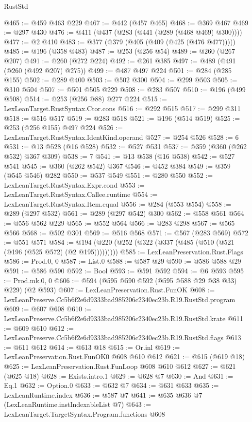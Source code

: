 \begin{lexlean}{RustStd}
\begin{coremodule}
@465 := @459 @463 @229
@467 := @442 (@457 @465)
@468 := @369 @467
@469 := @297 @430
@476 := @411 (@437 (@283 (@441 (@289 (@468 @469) @300))))
@477 := @2 @410
@483 := @377 (@379 (@405 (@409 (@425 (@476 @477)))))
@485 := @196 (@358 @483)
@487 := @253 (@256 @54)
@489 := @260 (@267 @207)
@491 := @260 (@272 @224)
@492 := @261 @385
@497 := @489 (@491 (@260 (@492 @207) @275))
@499 := @487 @497 @224
@501 := @284 (@285 @155)
@502 := @289 @400
@503 := @502 @300
@504 := @299 @503
@505 := @310 @504
@507 := @501 @505 @229
@508 := @283 @507
@510 := @196 (@499 @508)
@514 := @253 (@256 @88) @277 @224
@515 := LexLeanTarget.RustSyntax.Ctor.cons
@516 := @292 @515
@517 := @299 @311
@518 := @516 @517
@519 := @283 @518
@521 := @196 (@514 @519)
@525 := @253 (@256 @155) @497 @224
@526 := LexLeanTarget.RustSyntax.IdentKind.operand
@527 := @254 @526
@528 := 6
@531 := @13 @528 (@16 @528)
@532 := @527 @531
@537 := @359 (@360 (@262 @532) @367 @309)
@538 := 7
@541 := @13 @538 (@16 @538)
@542 := @527 @541
@545 := @360 (@262 @542) @367
@546 := @452 @384
@549 := @359 (@545 @546) @282
@550 := @537 @549
@551 := @280 @550
@552 := LexLeanTarget.RustSyntax.Expr.cond
@553 := LexLeanTarget.RustSyntax.Callee.runtime
@554 := LexLeanTarget.RustSyntax.Item.equal
@556 := @284 (@553 @554)
@558 := @289 (@297 @532)
@561 := @289 (@297 @542) @300
@562 := @558 @561
@564 := @556 @562 @229
@565 := @552 @564
@566 := @283 @298
@567 := @565 @566
@568 := @502 @301
@569 := @516 @568
@571 := @567 (@283 @569)
@572 := @551 @571
@584 := @194 (@220 (@252 (@322 (@337 (@485 (@510 (@521 (@196 (@525 @572) (@2 @195)))))))))
@585 := LexLeanPreservation.Rust.Flags
@586 := Prod.{0, 0}
@587 := List.{0}
@588 := @587 @29
@590 := @586 @588 @29
@591 := @586 @590
@592 := Bool
@593 := @591 @592
@594 := @6 @593
@595 := Prod.mk.{0, 0}
@606 := @594 (@595 @590 @592 (@595 @588 @29 @38 @33) @229) (@2 @593)
@607 := LexLeanPreservation.Rust.FunOK
@608 := LexLeanPreserve.Cc5b6f2e6d9333bad985206c2340ec23b.R19.RustStd.program
@609 := @607 @608
@610 := LexLeanPreserve.Cc5b6f2e6d9333bad985206c2340ec23b.R19.RustStd.krate
@611 := @609 @610
@612 := LexLeanPreserve.Cc5b6f2e6d9333bad985206c2340ec23b.R19.RustStd.flags
@613 := @611 @612
@614 := @613 @18
@615 := Or.inl
@619 := LexLeanPreservation.Rust.FunOK0 @608 @610 @612
@621 := @615 (@619 @18)
@625 := LexLeanPreservation.Rust.FunLoop @608 @610 @612
@627 := @621 (@625 @18)
@628 := Exists.intro.{1}
@629 := @628 @7
@630 := And
@631 := Eq.{1}
@632 := Option.{0}
@633 := @632 @7
@634 := @631 @633
@635 := LexLeanRuntime.index
@636 := @587 @7
@641 := @635 @636 @7 (LexLeanRuntime.instIndexableList @7)
@643 := LexLeanTarget.TargetSyntax.Program.functions @608

\end{coremodule}
\end{lexlean}
